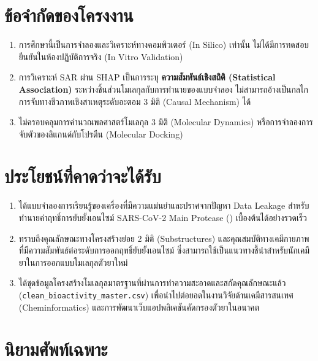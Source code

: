 \section{ข้อจำกัดของโครงงาน}

\begin{enumerate}[leftmargin=2em, itemsep=0.4em]
  \item การศึกษานี้เป็นการจำลองและวิเคราะห์ทางคอมพิวเตอร์ (In Silico) เท่านั้น ไม่ได้มีการทดสอบยืนยันในห้องปฏิบัติการจริง (In Vitro Validation)
  \item การวิเคราะห์ SAR ผ่าน SHAP เป็นการระบุ \textbf{ความสัมพันธ์เชิงสถิติ (Statistical Association)} ระหว่างชิ้นส่วนโมเลกุลกับการทำนายของแบบจำลอง ไม่สามารถอ้างเป็นกลไกการจับทางชีวภาพเชิงสาเหตุระดับอะตอม 3 มิติ (Causal Mechanism) ได้
  \item ไม่ครอบคลุมการคำนวณพลศาสตร์โมเลกุล 3 มิติ (Molecular Dynamics) หรือการจำลองการจับตัวของลิแกนด์กับโปรตีน (Molecular Docking)
\end{enumerate}

\section{ประโยชน์ที่คาดว่าจะได้รับ}

\begin{enumerate}[leftmargin=2em, itemsep=0.4em]
  \item ได้แบบจำลองการเรียนรู้ของเครื่องที่มีความแม่นยำและปราศจากปัญหา Data Leakage สำหรับทำนายค่าฤทธิ์การยับยั้งเอนไซม์ SARS-CoV-2 Main Protease (\pICfifty) เบื้องต้นได้อย่างรวดเร็ว
  \item ทราบถึงคุณลักษณะทางโครงสร้างย่อย 2 มิติ (Substructures) และคุณสมบัติทางเคมีกายภาพที่มีความสัมพันธ์ต่อระดับการออกฤทธิ์ยับยั้งเอนไซม์ ซึ่งสามารถใช้เป็นแนวทางชี้นำสำหรับนักเคมียาในการออกแบบโมเลกุลตัวยาใหม่
  \item ได้ชุดข้อมูลโครงสร้างโมเลกุลมาตรฐานที่ผ่านการทำความสะอาดและสกัดคุณลักษณะแล้ว (\texttt{clean\_bioactivity\_master.csv}) เพื่อนำไปต่อยอดในงานวิจัยด้านเคมีสารสนเทศ (Cheminformatics) และการพัฒนาเว็บแอปพลิเคชันคัดกรองตัวยาในอนาคต
\end{enumerate}

\clearpage
\section{นิยามศัพท์เฉพาะ}

